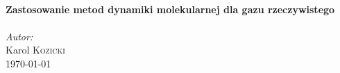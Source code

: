 \documentclass[a4paper,10pt]{article}
\begin{document}
\begin{titlepage}

\HRule \\[0.4cm]
{ \huge \bfseries Zastosowanie metod dynamiki molekularnej dla gazu rzeczywistego}\\[0.4cm] %
\HRule \\[1.5cm]
 


\Large \emph{Autor:}\\
Karol \textsc{Kozicki}\\[3cm] %


{\large \today}\\[3cm] %


 

\vfill %


\end{titlepage}
\end{document}
